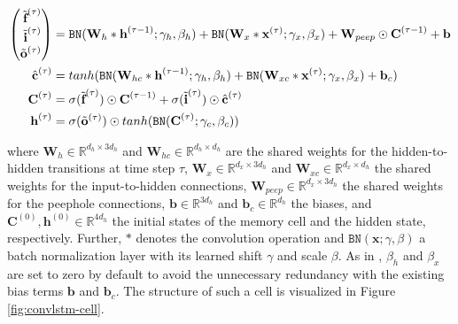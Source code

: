 \begin{equation} \label{eq:convlstm}
\begin{aligned}
\Spvek{\tilde{\textbf{f}}^{(\tau)}; \tilde{\textbf{i}}^{(\tau)}; \tilde{\textbf{o}}^{(\tau)}} &= \texttt{BN}(\textbf{W}_{h} \ast \textbf{h}^{(\tau-1)}; \gamma_h, \beta_h) + \texttt{BN}(\textbf{W}_{x} \ast \textbf{x}^{(\tau)}; \gamma_x, \beta_x) + \textbf{W}_{peep} \odot \textbf{C}^{(\tau-1)} + \textbf{b} \\
\hat{\textbf{c}}^{(\tau)} &= tanh(\texttt{BN}(\textbf{W}_{hc} \ast \textbf{h}^{(\tau-1)}; \gamma_h, \beta_h) + \texttt{BN}(\textbf{W}_{xc} \ast \textbf{x}^{(\tau)}; \gamma_x, \beta_x) + \textbf{b}_c) \\
\textbf{C}^{(\tau)} &= \sigma(\tilde{\textbf{f}}^{(\tau)}) \odot \textbf{C}^{(\tau-1)} + \sigma(\tilde{\textbf{i}}^{(\tau)}) \odot \hat{\textbf{c}}^{(\tau)} \\
\textbf{h}^{(\tau)} &= \sigma(\tilde{\textbf{o}}^{(\tau)}) \odot tanh(\texttt{BN}(\textbf{C}^{(\tau)}; \gamma_c, \beta_c))
\end{aligned}
\end{equation}

where $ \textbf{W}_h \in \mathbb{R}^{d_h \times 3d_h} $ and $ \textbf{W}_{hc} \in \mathbb{R}^{d_h \times d_h} $ are the shared weights for the hidden-to-hidden transitions at time step $ \tau $, $ \textbf{W}_x \in \mathbb{R}^{d_x \times 3d_h} $ and $ \textbf{W}_{xc} \in \mathbb{R}^{d_x \times d_h} $ the shared weights for the input-to-hidden connections, $ \textbf{W}_{peep} \in \mathbb{R}^{d_x \times 3d_h} $ the shared weights for the peephole connections, $ \textbf{b} \in \mathbb{R}^{3d_h} $ and $ \textbf{b}_c \in \mathbb{R}^{d_h} $ the biases, and $ \textbf{C}^{(0)}, \textbf{h}^{(0)} \in \mathbb{R}^{4d_h} $ the initial states of the memory cell and the hidden state, respectively. Further, $\ast$ denotes the convolution operation and $ \texttt{BN}(\textbf{x}; \gamma, \beta) $ a batch normalization layer with its learned shift $\gamma$ and scale $\beta$. As in \parencite{rnn-batchnorm}, $\beta_h$ and $\beta_x$ are set to zero by default to avoid the unnecessary redundancy with the existing bias terms $\textbf{b}$ and $\textbf{b}_c$. The structure of such a cell is visualized in Figure \ref{fig:convlstm-cell}.

